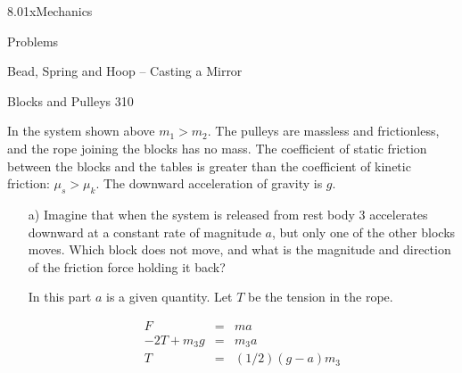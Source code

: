 \documentclass[12pt]{article}
\begin{document}
\begin{edXcourse}{8.01x}{Mechanics}

\begin{edXchapter}{Problems}

\begin{edXsection}{Bead, Spring and Hoop -- Casting a Mirror}

\begin{edXsequential}

\begin{edXproblem}{Blocks and Pulleys 3}{10}


\vspace{0.2in}

\centerline {
}

\vspace{0.1in}
In the system shown above $m_1 > m_2$. The pulleys are massless and frictionless, and the rope joining the blocks has no mass. The coefficient of static friction between the blocks and the tables is greater than the coefficient of kinetic friction: $\mu_s > \mu_k$. The downward acceleration of gravity is $g$. 
\begin{itemize}
\item[a)] 
Imagine that when the system is released from rest body 3 accelerates downward at a constant rate of magnitude $a$, but only one of the other blocks moves. Which block does not move, and what is the magnitude and direction of the friction force holding it back?

In this part $a$ is a given quantity. Let $T$ be the tension in the rope.



\begin{edXsolution}


\begin{minipage}{2.0in}
\vspace{.2in}
\centerline {
}
\vspace{.2in}
\end{minipage}
\begin{minipage}{3.5in}
\begin{eqnarray*}
F &=& ma\\
-2T +m_3 g &=& m_3 a\\
T &=& (1/2)(g-a)m_3\\
\end{eqnarray*}
\end{minipage}


\end{edXsolution}
\end{itemize}
\end{edXproblem}
\end{edXsequential}
\end{edXsection}
\end{edXchapter}
\end{edXcourse}
\end{document}
